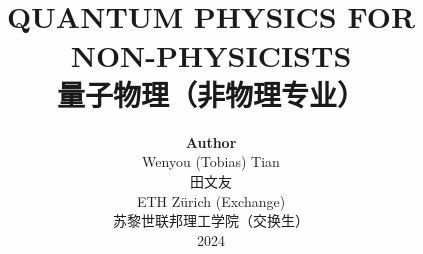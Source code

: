 \title{ \normalsize \textsc{}
		\\ [2.0cm]
		\HRule{1.5pt} \\
		\LARGE \textbf{\uppercase{Quantum Physics for Non-Physicists}
		\HRule{2.0pt} \\ [0.6cm] \LARGE{量子物理（非物理专业）} \vspace*{10\baselineskip}}
		}
\date{}
\author{\textbf{Author} \\ 
		Wenyou (Tobias) Tian \\
        田文友 \\
		ETH Z\"urich (Exchange) \\
        苏黎世联邦理工学院（交换生） \\
		2024}

\maketitle
\newpage

\tableofcontents
\newpage